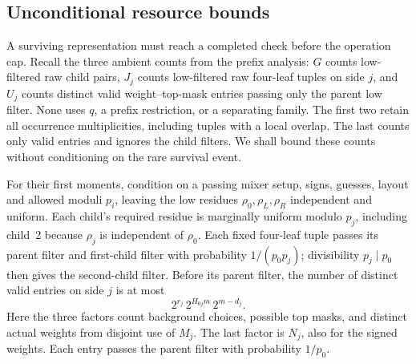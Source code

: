 \subsection{Unconditional resource bounds}\label{sec:resources}

A surviving representation must reach a completed check before the
operation cap. Recall the three ambient counts from the prefix
analysis: \(G\) counts low-filtered raw child pairs, \(J_j\) counts
low-filtered raw four-leaf tuples on side \(j\), and \(U_j\) counts
distinct valid weight--top-mask entries passing only the parent low
filter. None uses \(q\), a prefix restriction, or a separating family.
The first two retain all occurrence multiplicities, including tuples
with a local overlap. The last counts only valid entries and ignores
the child filters. We shall bound these counts without conditioning on
the rare survival event.

For their first moments, condition on a passing mixer setup, signs,
guesses, layout and allowed moduli \(p_i\), leaving the low residues
\(\rho_0,\rho_L,\rho_R\) independent and uniform. Each child's required
residue is marginally uniform modulo \(p_j\), including child~2 because
\(\rho_j\) is independent of \(\rho_0\). Each fixed four-leaf tuple
passes its parent filter and first-child filter with probability
\(1/(p_0p_j)\); divisibility \(p_j\mid p_0\) then gives the second-child
filter. Before its parent filter, the number of distinct valid entries
on side \(j\) is at most
\[
 2^{r_j}\,2^{H_{0j}m}\,2^{m-d_j}.
\]
Here the three factors count background choices, possible top masks,
and distinct actual weights from disjoint use of \(M_j\). The last
factor is \(N_j\), also for the signed weights. Each entry passes the
parent filter with probability \(1/p_0\).

